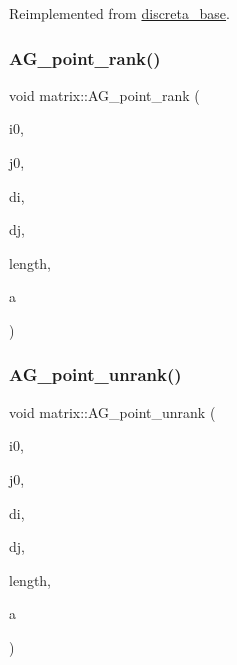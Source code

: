 Reimplemented from \mbox{\hyperlink{classdiscreta__base_a712a61311eb036d70a52871ed315f515}{discreta\+\_\+base}}.

\mbox{\label{classmatrix_a496577fb662ba6b5cb3e00d5f89b0860}} 
\subsubsection{\texorpdfstring{A\+G\+\_\+point\+\_\+rank()}{AG\_point\_rank()}}
{\footnotesize\ttfamily void matrix\+::\+A\+G\+\_\+point\+\_\+rank (\begin{DoxyParamCaption}\item[{\mbox{\hyperlink{galois_8h_a09fddde158a3a20bd2dcadb609de11dc}{I\+NT}}}]{i0,  }\item[{\mbox{\hyperlink{galois_8h_a09fddde158a3a20bd2dcadb609de11dc}{I\+NT}}}]{j0,  }\item[{\mbox{\hyperlink{galois_8h_a09fddde158a3a20bd2dcadb609de11dc}{I\+NT}}}]{di,  }\item[{\mbox{\hyperlink{galois_8h_a09fddde158a3a20bd2dcadb609de11dc}{I\+NT}}}]{dj,  }\item[{\mbox{\hyperlink{galois_8h_a09fddde158a3a20bd2dcadb609de11dc}{I\+NT}}}]{length,  }\item[{\mbox{\hyperlink{galois_8h_a09fddde158a3a20bd2dcadb609de11dc}{I\+NT}} \&}]{a }\end{DoxyParamCaption})}

\mbox{\label{classmatrix_ac1e0b45861b868e879cc00201f7d0706}} 
\subsubsection{\texorpdfstring{A\+G\+\_\+point\+\_\+unrank()}{AG\_point\_unrank()}}
{\footnotesize\ttfamily void matrix\+::\+A\+G\+\_\+point\+\_\+unrank (\begin{DoxyParamCaption}\item[{\mbox{\hyperlink{galois_8h_a09fddde158a3a20bd2dcadb609de11dc}{I\+NT}}}]{i0,  }\item[{\mbox{\hyperlink{galois_8h_a09fddde158a3a20bd2dcadb609de11dc}{I\+NT}}}]{j0,  }\item[{\mbox{\hyperlink{galois_8h_a09fddde158a3a20bd2dcadb609de11dc}{I\+NT}}}]{di,  }\item[{\mbox{\hyperlink{galois_8h_a09fddde158a3a20bd2dcadb609de11dc}{I\+NT}}}]{dj,  }\item[{\mbox{\hyperlink{galois_8h_a09fddde158a3a20bd2dcadb609de11dc}{I\+NT}}}]{length,  }\item[{\mbox{\hyperlink{galois_8h_a09fddde158a3a20bd2dcadb609de11dc}{I\+NT}}}]{a }\end{DoxyParamCaption})}

